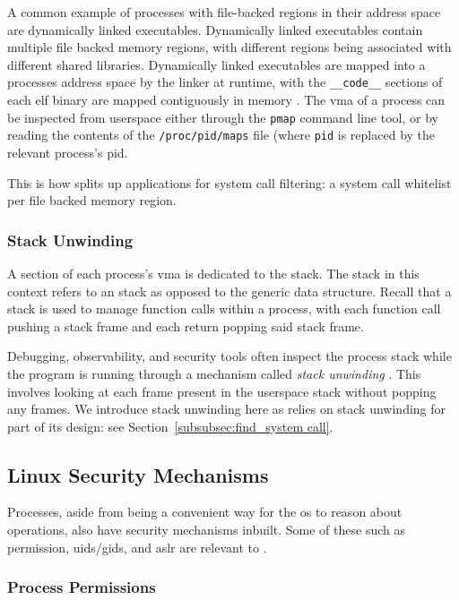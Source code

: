 A common example of processes with file-backed regions in their address space
are dynamically linked executables. Dynamically linked executables contain
multiple file backed memory regions, with different regions being associated
with different shared libraries. Dynamically linked executables are mapped
into a processes address space by the linker at runtime, with the
\texttt{\_\_code\_\_} sections of each \ac{elf} binary are mapped contiguously 
in memory \cite{DYNAMIC_LINKERS_OS}. The \ac{vma} of a process can be
inspected from userspace either through the \texttt{pmap} command line tool, or
by reading the contents of the \texttt{/proc/pid/maps} file (where \texttt{pid}
is replaced by the relevant process's \ac{pid}.

This is how \af splits up applications for system call filtering: a system call
whitelist per file backed memory region.

\subsubsection{Stack Unwinding}

A section of each process's \ac{vma} is dedicated to the stack. The stack in
this context refers to an  stack as opposed to the generic data
structure. Recall that a stack is used to manage function calls within a
process, with each function call pushing a stack frame and each return popping
said stack frame.
 
Debugging, observability, and security tools often inspect the process stack
while the program is running through a mechanism called \textit{stack
unwinding} \cite{gregg2014linux, kilroy2022linker}. This involves looking at 
each frame present in the userspace stack without popping any frames. We
introduce stack unwinding here as \af relies on stack unwinding for part of
its design: see Section~\ref{subsubsec:find_system call}.

\subsection{Linux Security Mechanisms}

Processes, aside from being a convenient way for the \ac{os} to reason about
operations, also have security mechanisms inbuilt. Some of these such as
permission, \acp{uid}/\acp{gid}, and \ac{aslr} are relevant to \af.

\subsubsection{Process Permissions}

